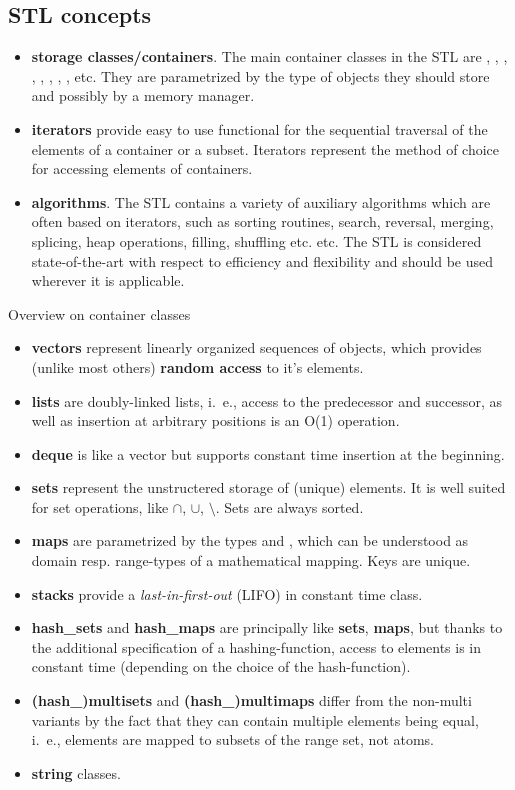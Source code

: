 \subsection{STL concepts}
\begin{itemize}
\item {\bf storage classes/containers}. The main container classes in the STL are , , , , , , , , etc. They are parametrized by the type of objects they should store and possibly by a memory manager.
\item {\bf iterators} provide easy to use functional for the sequential traversal of the elements of a container or a subset. Iterators represent the method of choice for accessing elements of containers.
\item {\bf algorithms}. The STL contains a variety of auxiliary algorithms which are often based on iterators, such as sorting routines, search, reversal, merging, splicing, heap operations, filling, shuffling etc. etc. The STL is considered state-of-the-art with respect to efficiency and flexibility and should be used wherever it is applicable.
\end{itemize}


\centerline{\large Overview on container classes}
\begin{itemize}
\item {\bf vectors} represent linearly organized sequences of objects, which provides (unlike most others) {\bf random access} to it's elements.
\item {\bf lists} are doubly-linked lists, i.~e., access to the predecessor and successor, as well as insertion at arbitrary positions is an O(1) operation.
\item {\bf deque} is like a vector but supports constant time insertion at the beginning.
\item {\bf sets} represent the unstructered storage of (unique) elements. It is well suited for set operations, like $\cap$, $\cup$, $\setminus$. Sets are always sorted.
\item {\bf maps} are parametrized by the types  and , which can be understood as domain resp. range-types of a mathematical mapping. Keys are unique.
\item {\bf stacks} provide a {\em last-in-first-out} (LIFO) in constant time class.
\item {\bf hash\_sets} and {\bf hash\_maps} are principally like {\bf sets}, {\bf maps}, but thanks to the additional specification of a hashing-function,
access to elements is in constant time (depending on the choice of the hash-function).

\item {\bf (hash\_)multisets} and {\bf (hash\_)multimaps} differ from the non-multi variants by the fact that they can contain multiple elements being equal, i.~e., elements are mapped to subsets of the range set, not atoms.

\item {\bf string} classes.

\end{itemize}


